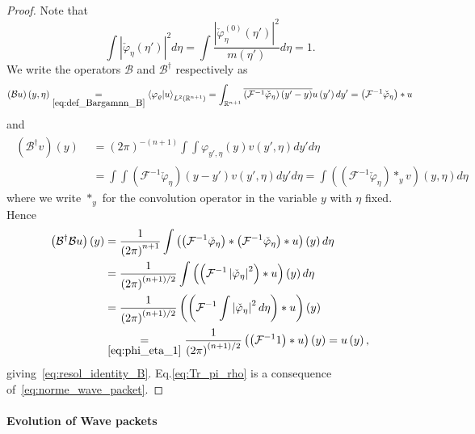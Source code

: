\documentclass[10pt]{amsart}
\theoremstyle{definition}\newtheorem{defi}[theo]{Definition}\newtheorem{rema}[theo]{Remark}\newtheorem{exam}[theo]{Example}\newtheorem{exem}[theo]{Example}\newtheorem{nota}[theo]{Notation}
\newcommand{\clF}{\mathcal{F}}
\newcommand{\clB}{\mathcal{B}}
\newcommand{\bbR}{\mathbb{R}}
\begin{document}
\begin{proof}
Note that
\begin{equation}\label{eq:phi_eta_1}
\int\left|\check{\varphi}_{\eta}\left(\eta'\right)\right|^{2}d\eta=\int\frac{\left|\check{\varphi}_{\eta}^{\left(0\right)}\left(\eta'\right)\right|^{2}}{m\left(\eta'\right)}d\eta=1.
\end{equation}
We write the operators $\clB$ and $\clB^{\dagger}$ respectively as
\[
\left(\clB u\right)\left(y,\eta\right)\underset{\eqref{eq:def_Bargamnn_B}}{=}\left\langle \varphi_{\varrho}|u\right\rangle _{L^{2}\left(\bbR^{n+1}\right)}=\int_{\bbR^{n+1}}\overline{\left(\clF^{-1}\check{\varphi}_{\eta}\right)\left(y'-y\right)}u\left(y'\right)dy'=\left(\clF^{-1}\check{\varphi}_{\eta}\right)\ast u
\]
and
\begin{align*}
\begin{aligned}\left(\clB^{\dagger}v\right)\left(y\right)
\end{aligned}
& =\left(2\pi\right)^{-(n+1)}\int\int\varphi_{y',\eta}\left(y\right)v\left(y',\eta\right)dy'd\eta\\
& =\int\int\left(\clF^{-1}\check{\varphi}_{\eta}\right)\left(y-y'\right)v\left(y',\eta\right)dy'd\eta=\int\left(\left(\clF^{-1}\check{\varphi}_{\eta}\right)\ast_{y}v\right)\left(y,\eta\right)d\eta
\end{align*}
where we write $\ast_{y}$ for the convolution operator in the variable $y$ with $\eta$ fixed. Hence
\begin{align*}
\left(\clB^{\dagger}\clB u\right)\left(y\right) & = \frac{1}{\left(2\pi\right)^{n+1}}\int\left(\left(\clF^{-1}\check{\varphi}_{\eta}\right)\ast\left(\clF^{-1}\check{\varphi}_{\eta}\right)\ast u\right)\left(y\right)d\eta\\
& = \frac{1}{\left(2\pi\right)^{\left(n+1\right)/2}}\int\left(\left(\clF^{-1}\left|\check{\varphi}_{\eta}\right|^{2}\right)\ast u\right)\left(y\right)d\eta\\
& = \frac{1}{\left(2\pi\right)^{\left(n+1\right)/2}}\left(\left(\clF^{-1}\int\left|\check{\varphi}_{\eta}\right|^{2}d\eta\right)\ast u\right)\left(y\right)\\
& \underset{\eqref{eq:phi_eta_1}}{=} \frac{1}{\left(2\pi\right)^{\left(n+1\right)/2}}\left(\left(\clF^{-1}1\right)\ast u\right)\left(y\right)=u\left(y\right),
\end{align*}
giving~\eqref{eq:resol_identity_B}. Eq.\eqref{eq:Tr_pi_rho} is a consequence of~\eqref{eq:norme_wave_packet}.
\end{proof}

\paragraph{Evolution of Wave packets}
\end{document}
